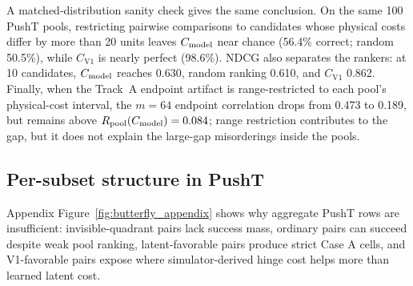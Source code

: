 A matched-distribution sanity check gives the same conclusion. On the same 100 PushT pools, restricting pairwise comparisons to candidates whose physical costs differ by more than 20 units leaves $C_\text{model}$ near chance (56.4\% correct; random 50.5\%), while $C_\mathrm{V1}$ is nearly perfect (98.6\%). NDCG also separates the rankers: at 10 candidates, $C_\text{model}$ reaches 0.630, random ranking 0.610, and $C_\mathrm{V1}$ 0.862. Finally, when the Track~A endpoint artifact is range-restricted to each pool's physical-cost interval, the $m=64$ endpoint correlation drops from 0.473 to 0.189, but remains above $R_\text{pool}(C_\text{model})=0.084$; range restriction contributes to the gap, but it does not explain the large-gap misorderings inside the pools.

\subsection{Per-subset structure in PushT}

Appendix Figure~\ref{fig:butterfly_appendix} shows why aggregate PushT rows are insufficient: invisible-quadrant pairs lack success mass, ordinary pairs can succeed despite weak pool ranking, latent-favorable pairs produce strict Case A cells, and V1-favorable pairs expose where simulator-derived hinge cost helps more than learned latent cost.
